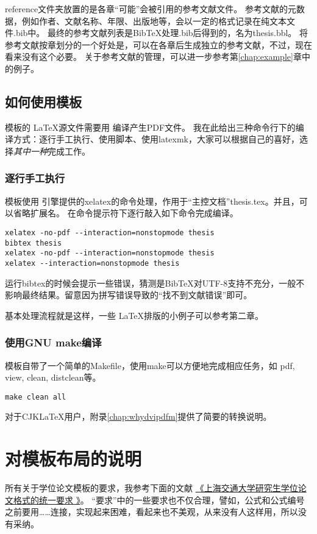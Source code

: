 reference文件夹放置的是各章``可能''会被引用的参考文献文件。
参考文献的元数据，例如作者、文献名称、年限、出版地等，会以一定的格式记录在纯文本文件.bib中。
最终的参考文献列表是BibTeX处理.bib后得到的，名为thesis.bbl。
将参考文献按章划分的一个好处是，可以在各章后生成独立的参考文献，不过，现在看来没有这个必要。
关于参考文献的管理，可以进一步参考第\ref{chap:example}章中的例子。

\subsection{如何使用模板}
\label{sec:process}

模板的 \LaTeX 源文件需要用 \XeTeX 编译产生PDF文件。
我在此给出三种命令行下的编译方式：逐行手工执行、使用脚本、使用latexmk，大家可以根据自己的喜好，选择\emph{其中一种}完成工作。

\subsubsection{逐行手工执行}

模板使用 \XeTeX 引擎提供的xelatex的命令处理，作用于“主控文档”thesis.tex。并且，可以省略扩展名。
在命令提示符下逐行敲入如下命令完成编译。

\begin{lstlisting}[basicstyle=\small\ttfamily, caption={手动执行编译过程}, numbers=none]
xelatex -no-pdf --interaction=nonstopmode thesis
bibtex thesis 
xelatex -no-pdf --interaction=nonstopmode thesis
xelatex --interaction=nonstopmode thesis 
\end{lstlisting}

运行bibtex的时候会提示一些错误，猜测是{{\sc Bib}\TeX}对UTF-8支持不充分，一般不影响最终结果。留意因为拼写错误导致的``找不到文献错误''即可。

基本处理流程就是这样，一些 \LaTeX 排版的小例子可以参考第二章。

\subsubsection{使用GNU make编译}

模板自带了一个简单的Makefile，使用make可以方便地完成相应任务，如 pdf, view, clean, distclean等。

\begin{lstlisting}[basicstyle=\small\ttfamily, caption={使用GNU make编译}, numbers=none]
make clean all
\end{lstlisting}

对于CJK\LaTeX{}用户，附录\ref{chap:whydvipdfm}提供了简要的转换说明。

\section{对模板布局的说明}
\label{sec:thesisformat}

所有关于学位论文模板的要求，我参考下面的文献
\href{http://www.gs.sjtu.edu.cn/policy/fileShow.ahtml?id=130}{《上海交通大学研究生学位论文格式的统一要求 》}。
``要求''中的一些要求也不仅合理，譬如，公式和公式编号之前要用……连接，实现起来困难，看起来也不美观，从来没有人这样用，所以没有采纳。

